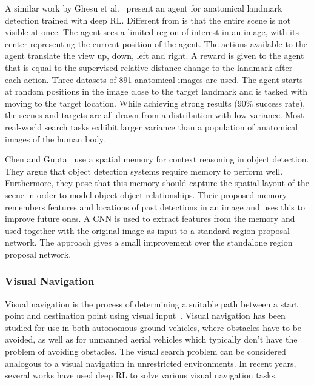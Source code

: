A similar work by Ghesu et al.~\cite{ourselin_artificial_2016} present an agent for anatomical landmark detection trained with deep RL.
Different from \cite{caicedo_active_2015} is that the entire scene is not visible at once.
The agent sees a limited region of interest in an image, with its center representing the current position of the agent.
The actions available to the agent translate the view up, down, left and right.
A reward is given to the agent that is equal to the supervised relative distance-change to the landmark after each action.
Three datasets of 891 anatomical images are used.
The agent starts at random positions in the image close to the target landmark and is tasked with moving to the target location.
While achieving strong results (90\% success rate), the scenes and targets are all drawn from a distribution with low variance.
Most real-world search tasks exhibit larger variance than a population of anatomical images of the human body.

Chen and Gupta~\cite{chen_spatial_2017} use a spatial memory for context reasoning in object detection.
They argue that object detection systems require memory to perform well.
Furthermore, they pose that this memory should capture the spatial layout of the scene in order to model object-object relationships.
Their proposed memory remembers features and locations of past detections in an image and uses this to improve future ones.
A CNN is used to extract features from the memory and used together with the original image as input to a standard region proposal network.
The approach gives a small improvement over the standalone region proposal network.

\subsubsection{Visual Navigation}

Visual navigation is the process of determining a suitable path between a start point and destination point using visual input~\cite{bonin-font_visual_2008}.
Visual navigation has been studied for use in both autonomous ground vehicles, where obstacles have to be avoided, as well as for unmanned aerial vehicles which typically don't have the problem of avoiding obstacles.
The visual search problem can be considered analogous to a visual navigation in unrestricted environments.
In recent years, several works have used deep RL to solve various visual navigation tasks.

